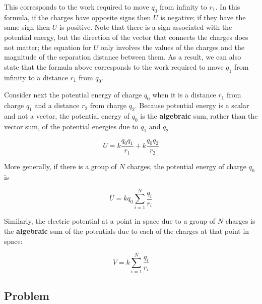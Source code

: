 \documentclass{article}
\begin{document}
This corresponds to the work required to move $q_0$ from infinity to $r_1$. 
In this formula, if the charges have opposite signs then $U$ is negative; if they have the same sign then $U$  is positive. Note that there is a sign associated with the potential energy, but the direction of the vector that connects the charges does not matter; the equation for $U$ only involves the values of the charges and the magnitude of the separation distance between them. As a result, we can also state that the formula above corresponds to the work required to move $q_1$ from infinity to a distance $r_1$ from $q_0$.

Consider next the potential energy of charge $q_0$ when it is a distance $r_1$ from charge $q_1$ and a distance $r_2$ from charge $q_2$. Because potential energy is a scalar and not a vector, the potential energy of $q_0$ is the \textbf{algebraic} sum, rather than the vector sum, of the potential energies due to $q_1$ and $q_2$

\begin{equation}
U=k\frac{q_0q_1}{r_1}+k\frac{q_0q_2}{r_2}
\end{equation}

More generally, if there is a group of $N$ charges, the potential energy of charge $q_0$ is

\begin{equation}
U=k q_0 \sum_{i=1}^N {\frac{q_i}{r_i}}
\end{equation}

Similarly, the electric potential at a point in space due to a group of $N$ charges is the \textbf{algebraic} sum of the potentials due to each of the charges at that point in space:

\begin{equation}
V=k \sum_{i=1}^N {\frac{q_i}{r_i}}
\end{equation}

\newpage

\subsection{Problem}


\end{document}
